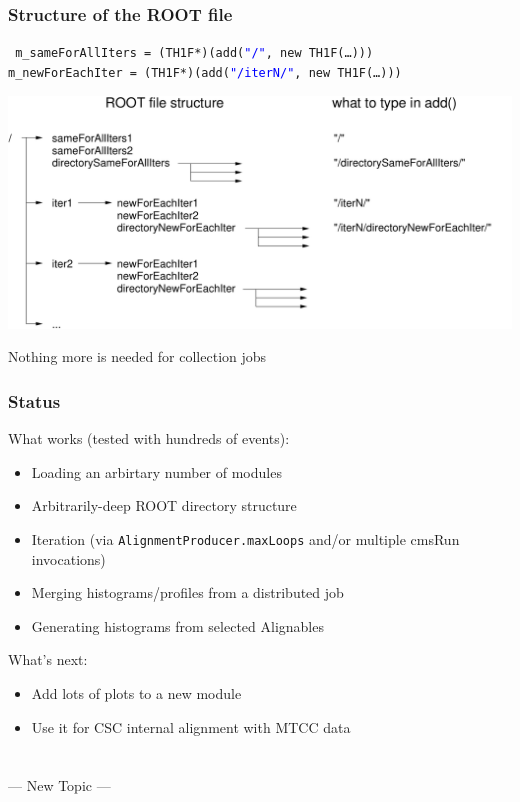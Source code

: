 \documentclass[compress]{beamer}
\begin{document}
\begin{frame}
\frametitle{Structure of the ROOT file}
\begin{minipage}{\linewidth}
\tt \small
m\_sameForAllIters = (TH1F*)(add(\textcolor{blue}{"/"}, new TH1F(\ldots))) \\
m\_newForEachIter = (TH1F*)(add(\textcolor{blue}{"/iterN/"}, new TH1F(\ldots))) \\
\end{minipage}

\vfill
\includegraphics[width=\linewidth]{rootfile}

\vfill
Nothing more is needed for collection jobs
\end{frame}

\begin{frame}
\frametitle{Status}
What works (tested with hundreds of events):
\begin{itemize}
  \item Loading an arbirtary number of modules
  \item Arbitrarily-deep ROOT directory structure
  \item Iteration (via {\tt AlignmentProducer.maxLoops} and/or multiple cmsRun invocations)
  \item Merging histograms/profiles from a distributed job
  \item Generating histograms from selected Alignables
\end{itemize}

\vfill
What's next:
\begin{itemize}
  \item Add lots of plots to a new module
  \item Use it for CSC internal alignment with MTCC data
\end{itemize}
\end{frame}

\section*{}
\begin{frame}
\Huge
\begin{center}--- New Topic ---\end{center}
\end{frame}
\end{document}
